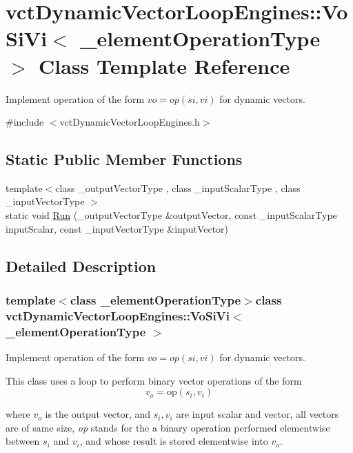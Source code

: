 \hypertarget{classvct_dynamic_vector_loop_engines_1_1_vo_si_vi}{\section{vct\-Dynamic\-Vector\-Loop\-Engines\-:\-:Vo\-Si\-Vi$<$ \-\_\-element\-Operation\-Type $>$ Class Template Reference}
\label{classvct_dynamic_vector_loop_engines_1_1_vo_si_vi}
}


Implement operation of the form $vo = op(si, vi)$ for dynamic vectors.  




{\ttfamily \#include $<$vct\-Dynamic\-Vector\-Loop\-Engines.\-h$>$}

\subsection*{Static Public Member Functions}
\begin{DoxyCompactItemize}
\item 
{\footnotesize template$<$class \-\_\-output\-Vector\-Type , class \-\_\-input\-Scalar\-Type , class \-\_\-input\-Vector\-Type $>$ }\\static void \hyperlink{classvct_dynamic_vector_loop_engines_1_1_vo_si_vi_a276329ee86e7059f7bbb3efc471bd21f}{Run} (\-\_\-output\-Vector\-Type \&output\-Vector, const \-\_\-input\-Scalar\-Type input\-Scalar, const \-\_\-input\-Vector\-Type \&input\-Vector)
\end{DoxyCompactItemize}


\subsection{Detailed Description}
\subsubsection*{template$<$class \-\_\-element\-Operation\-Type$>$class vct\-Dynamic\-Vector\-Loop\-Engines\-::\-Vo\-Si\-Vi$<$ \-\_\-element\-Operation\-Type $>$}

Implement operation of the form $vo = op(si, vi)$ for dynamic vectors. 

This class uses a loop to perform binary vector operations of the form \[ v_o = \mathrm{op}(s_i, v_i) \]

where $v_o$ is the output vector, and $s_i, v_i$ are input scalar and vector, all vectors are of same size, {\itshape op} stands for the a binary operation performed elementwise between $s_i$ and $v_i$, and whose result is stored elementwise into $v_o$.


